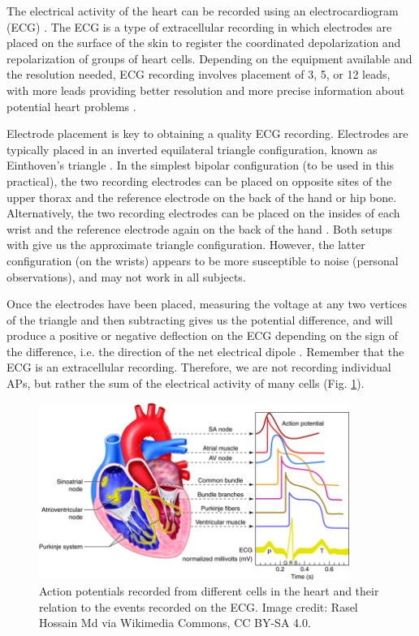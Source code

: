 \documentclass[12pt]{article}
\begin{document}
The electrical activity of the heart can be recorded using an electrocardiogram (ECG) \cite{openStaxElectrical,mohrman2006cardiovascular,CVphys}. The ECG is a type of extracellular recording in which electrodes are placed on the surface of the skin to register the coordinated depolarization and repolarization of groups of heart cells. Depending on the equipment available and the resolution needed, ECG recording involves placement of 3, 5, or 12 leads, with more leads providing better resolution and more precise information about potential heart problems \cite{openStaxElectrical}. 

Electrode placement is key to obtaining a quality ECG recording. Electrodes are typically placed in an inverted equilateral triangle configuration, known as Einthoven's triangle \cite{mohrman2006cardiovascular,backyardBrainsECG}. In the simplest bipolar configuration (to be used in this practical), the two recording electrodes can be placed on opposite sites of the upper thorax and the reference electrode on the back of the hand or hip bone. Alternatively, the two recording electrodes can be placed on the insides of each wrist and the reference electrode again on the back of the hand \cite{backyardBrainsECG}. Both setups with give us the approximate triangle configuration. However, the latter configuration (on the wrists) appears to be more susceptible to noise (personal observations), and may not work in all subjects.

Once the electrodes have been placed, measuring the voltage at any two vertices of the triangle and then subtracting gives us the potential difference, and will produce a positive or negative deflection on the ECG depending on the sign of the difference, i.e. the direction of the net electrical dipole \cite{mohrman2006cardiovascular}. Remember that the ECG is an extracellular recording. Therefore, we are not recording individual APs, but rather the sum of the electrical activity of many cells (Fig. \ref{fig:ecgAPs}). 

\begin{figure}[h!]
\centering
\includegraphics[width=0.9\textwidth]{figures/ecgAPs.jpg}
\caption{Action potentials recorded from different cells in the heart and their relation to the events recorded on the ECG. Image credit: Rasel Hossain Md via Wikimedia Commons, CC BY-SA 4.0.}
\label{fig:ecgAPs}
\end{figure}%
\end{document}
